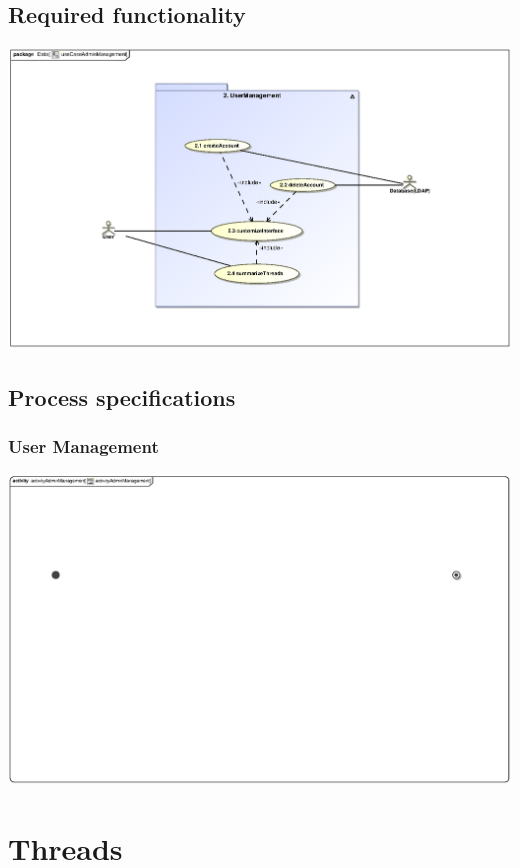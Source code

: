 \documentclass[hidelinks, 12pt, oneside]{article}
\begin{document}
\subsection{Required functionality} 
\includegraphics[scale=.9]{Shaun/graphics/useCaseAdminManagement.eps}\\

\subsection{Process specifications}
\subsubsection{User Management}
\includegraphics[scale=.9]{Shaun/graphics/activityAdminManagement.eps}\\


\section{Threads}
\end{document}
